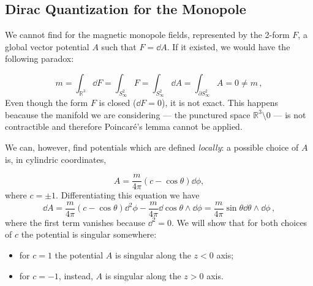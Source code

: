 \documentclass[main.tex]{subfiles}
\begin{document}
\subsection{Dirac Quantization for the Monopole}
We cannot find for the magnetic monopole fields, represented by the 2-form $F$, a global vector potential $A$ such that $F=\dd{A}$.  If it existed, we would have the following paradox:

\begin{equation} \label{eq:different-potentials}
 m= \int_{\mathbb R^3} \dd{F}
= \int_{S^2_\infty} F
 =\int_{S^2_\infty}\dd{A}=\int_{\partial S^2_\infty}A=0 \neq m\,,
\end{equation}
%
Even though the form \(F\) is closed ($\dd{F}=0$), it is not exact. This happens beacause the manifold we are considering --- the punctured space $\mathbb R ^3 \setminus \qty{0}$ --- is not contractible and therefore Poincaré's lemma cannot be applied.



We can, however, find potentials which are defined \emph{locally}: a possible choice of $A$ is, in cylindric coordinates,

\begin{equation}
A=\frac{m}{4\pi}\left(c-\cos\theta\right)\dd{\phi},
\end{equation}
where $c = \pm 1$. Differentiating this equation we have
%
\begin{equation}
\dd{A}=\frac{m}{4\pi}\left(c-\cos\theta\right)\dd^2\phi-\frac{m}{4\pi}\dd{\cos\theta}\wedge \dd{\phi}=\frac{m}{4\pi}\sin\theta \dd{\theta}\wedge \dd{\phi}\,,
\end{equation}
where the first term vanishes because \(\dd^2 = 0\).
%
We will show that for both choices of $c$ the potential is singular somewhere:
%
\begin{itemize}
\item for $c=1$ the potential \(A\) is singular along the \(z<0\) axis;
\item for $c=-1$, instead, \(A\) is singular along the \(z>0\) axis.
\end{itemize}
\end{document}
